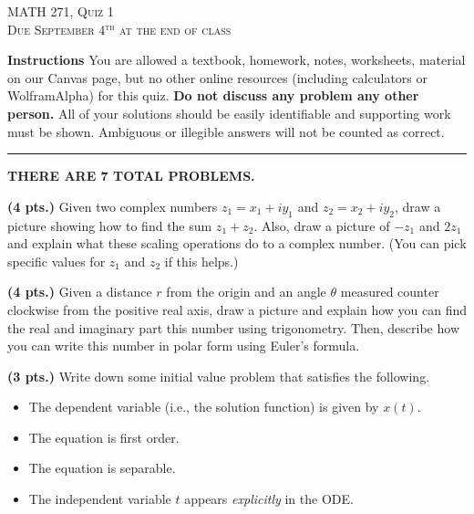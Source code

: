 \documentclass[12pt]{amsbook}
\begin{document}

\begin{center}
   \textsc{\large MATH 271, Quiz 1}\\
   \textsc{Due September 4$^\textrm{th}$ at the end of class}
\end{center}

\vspace{1cm}

\noindent\textbf{Instructions} \; You are allowed a textbook, homework, notes, worksheets, material on our Canvas page, but no other online resources (including calculators or WolframAlpha) for this quiz.  \textbf{Do not discuss any problem any other person.} All of your solutions should be easily identifiable and supporting work must be shown.  Ambiguous or illegible answers will not be counted as correct.


\vspace*{.5cm}
\hrule
\vspace*{.5cm}

\begin{center}\textbf{\large THERE ARE 7 TOTAL PROBLEMS.}\normalsize \end{center}

\begin{problem}
\textbf{(4 pts.)} Given two complex numbers $z_1=x_1+iy_1$ and $z_2 = x_2+iy_2$, draw a picture showing how to find the sum $z_1+z_2$. Also, draw a picture of $-z_1$ and $2z_1$ and explain what these scaling operations do to a complex number. (You can pick specific values for $z_1$ and $z_2$ if this helps.) 
\end{problem}

\begin{problem}
\textbf{(4 pts.)} Given a distance $r$ from the origin and an angle $\theta$ measured counter clockwise from the positive real axis, draw a picture and explain how you can find the real and imaginary part this number using trigonometry. Then, describe how you can write this number in polar form using Euler's formula.
\end{problem}

\begin{problem}
\textbf{(3 pts.)} Write down some initial value problem that satisfies the following.
\begin{itemize}
    \item The dependent variable (i.e., the solution function) is given by $x(t)$.
    \item The equation is first order.
    \item The equation is separable.
    \item The independent variable $t$ appears \emph{explicitly} in the ODE.
\end{itemize}
\end{problem}
\end{document}
